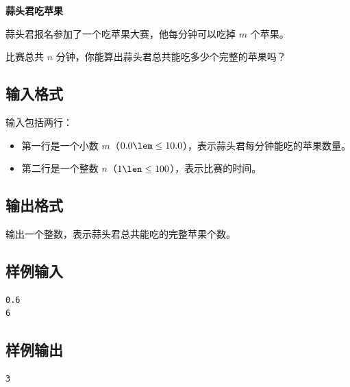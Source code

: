 \documentclass{article}
\newcommand{\problemname}[1]{\begin{center}\Large\bfseries #1\end{center}}
\begin{document}
\problemname{蒜头君吃苹果}

蒜头君报名参加了一个吃苹果大赛，他每分钟可以吃掉 $m$ 个苹果。

比赛总共 $n$ 分钟，你能算出蒜头君总共能吃多少个完整的苹果吗？

\subsection*{输入格式}
输入包括两行：

\begin{itemize}
  \item 第一行是一个小数 $m$（$0.0\lem\le10.0$），表示蒜头君每分钟能吃的苹果数量。

  \item 第二行是一个整数 $n$（$1\len\le100$），表示比赛的时间。

\end{itemize}
\subsection*{输出格式}
输出一个整数，表示蒜头君总共能吃的完整苹果个数。

\subsection*{样例输入}
\begin{verbatim}
0.6
6
\end{verbatim}

\subsection*{样例输出}
\begin{verbatim}
3
\end{verbatim}
\end{document}
